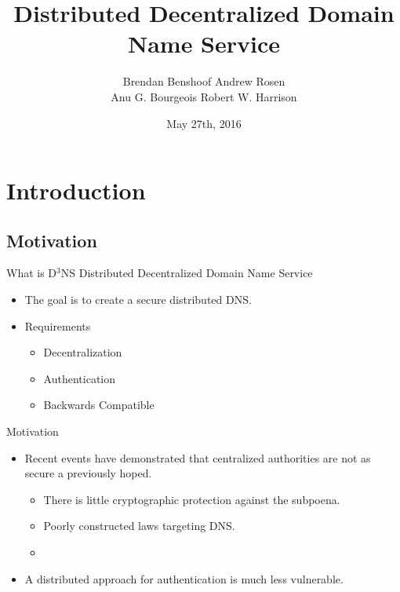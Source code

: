 \documentclass[11pt]{beamer}
\title[D$^3$NS]{Distributed Decentralized Domain Name Service}
\author{
Brendan Benshoof \qquad Andrew Rosen \\ \qquad Anu G. Bourgeois \qquad Robert W. Harrison }
\institute{Georgia State University}
\date{May 27th, 2016}
\begin{document}
	
\maketitle

\section{Introduction}
\subsection{Motivation}

\begin{frame}{What is D$^3$NS}
Distributed Decentralized Domain Name Service

\begin{itemize}
	\item The goal is to create a secure distributed DNS. 
	\item Requirements 
	\begin{itemize}
		\item Decentralization
		\item Authentication
		\item Backwards Compatible
	\end{itemize}
\end{itemize}

\end{frame}



\begin{frame}{Motivation}
	\begin{itemize}
		\item  Recent events have demonstrated that centralized authorities are not as secure a previously hoped.
		\begin{itemize}
			\item There is little cryptographic protection against the subpoena.
			\item Poorly constructed laws targeting DNS.
			\item %
		\end{itemize}	
		\item  A distributed approach for authentication is much less vulnerable.
	
	\end{itemize}
\end{frame}
\end{document}
